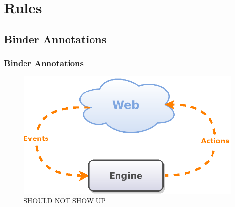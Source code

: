 
\chapter{Rules}
\section{Binder Annotations}
\subsection{Binder Annotations}


\begin{figure}[!ht]
  \centering
  \includegraphics{figures/Conceptual_Model_Simple}
  \caption{SHOULD NOT SHOW UP}
  \label{fig:Conceptual_Model_Simpledummy}
\end{figure}
